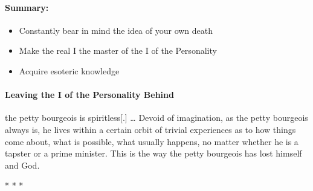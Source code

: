 \paragraph{Summary:}
\begin{itemize}
\item Constantly bear in mind the idea of your own death 
\item Make the real I the master of the I of the Personality 
\item Acquire esoteric knowledge 
\end{itemize}
\paragraph{Leaving the I of the Personality Behind}
\begin{quotex}
the petty bourgeois is spiritless[.] … Devoid of imagination, as the petty bourgeois always is, he lives within a certain orbit of trivial experiences as to how things come about, what is possible, what usually happens, no matter whether he is a tapster or a prime minister. This is the way the petty bourgeois has lost himself and God. 

\end{quotex}



\begin{center}* * *\end{center}

